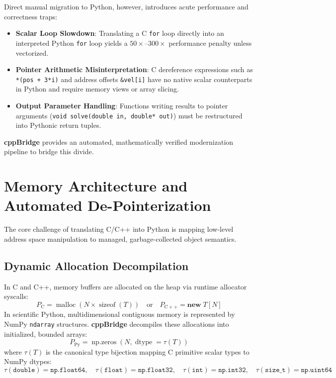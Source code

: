 \documentclass[11pt,a4paper]{article}
\theoremstyle{definition}
\begin{document}
Direct manual migration to Python, however, introduces acute performance and correctness traps:
\begin{itemize}
    \item \textbf{Scalar Loop Slowdown}: Translating a C \texttt{for} loop directly into an interpreted Python \texttt{for} loop yields a $50\times$--$300\times$ performance penalty unless vectorized.
    \item \textbf{Pointer Arithmetic Misinterpretation}: C dereference expressions such as \texttt{*(pos + 3*i)} and address offsets \texttt{\&vel[i]} have no native scalar counterparts in Python and require memory views or array slicing.
    \item \textbf{Output Parameter Handling}: Functions writing results to pointer arguments (\texttt{void solve(double in, double* out)}) must be restructured into Pythonic return tuples.
\end{itemize}

\textbf{cppBridge} provides an automated, mathematically verified modernization pipeline to bridge this divide.

\section{Memory Architecture and Automated De-Pointerization}

The core challenge of translating C/C++ into Python is mapping low-level address space manipulation to managed, garbage-collected object semantics.

\subsection{Dynamic Allocation Decompilation}

In C and C++, memory buffers are allocated on the heap via runtime allocator syscalls:
\begin{equation}
    P_{\mathrm{C}} = \operatorname{malloc}(N \times \operatorname{sizeof}(T)) \quad \text{or} \quad P_{\mathrm{C++}} = \mathbf{new}\; T[N]
\end{equation}
In scientific Python, multidimensional contiguous memory is represented by NumPy \texttt{ndarray} structures. \textbf{cppBridge} decompiles these allocations into initialized, bounded arrays:
\begin{equation}
    P_{\mathrm{Py}} = \operatorname{np.zeros}(N, \operatorname{dtype}=\tau(T))
\end{equation}
where $\tau(T)$ is the canonical type bijection mapping C primitive scalar types to NumPy dtypes:
\begin{equation}
    \tau(\texttt{double}) = \texttt{np.float64}, \quad \tau(\texttt{float}) = \texttt{np.float32}, \quad \tau(\texttt{int}) = \texttt{np.int32}, \quad \tau(\texttt{size\_t}) = \texttt{np.uint64}
\end{equation}
\end{document}
